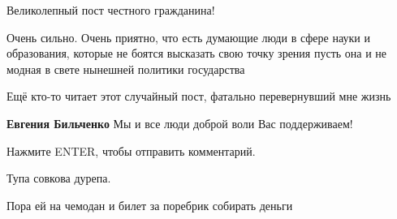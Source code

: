 \begin{itemize}

Великолепный пост честного гражданина!


Очень сильно. Очень приятно, что есть думающие люди в сфере науки и образования, которые не боятся высказать свою точку зрения пусть она и не модная в свете нынешней политики государства


Ещё кто-то читает этот случайный пост, фатально перевернувший мне жизнь


\textbf{Евгения Бильченко} Мы и все люди доброй воли Вас поддерживаем!


Нажмите ENTER, чтобы отправить комментарий.

Тупа совкова дурепа.


Пора ей на чемодан и билет за поребрик собирать деньги


\end{itemize}


